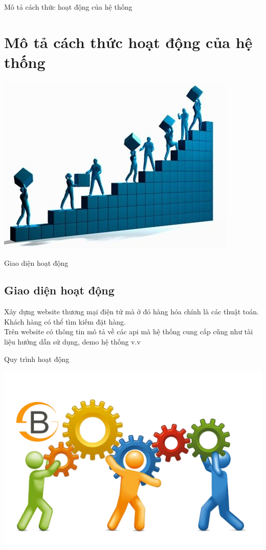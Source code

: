 \documentclass{beamer}
\begin{document}
\begin{frame}{Mô tả cách thức hoạt động của hệ thống}
\section{Mô tả cách thức hoạt động của hệ thống}
\begin{center}
\includegraphics[scale=0.5]{TK.jpg}
\end{center}

\end{frame}
\begin{frame}{Giao diện hoạt động}

\subsection{Giao diện hoạt động}
Xây dựng website thương mại điện tử mà ở đó hàng hóa chính là các thuật toán. Khách hàng có thể tìm kiếm đặt hàng.\\

Trên website có thông tin mô tả về các api mà hệ thống cung cấp cũng như tài liệu hướng dẫn sử dụng, demo hệ thống v.v
\end{frame}
\begin{frame}{Quy trình hoạt động}
\begin{center}
\includegraphics[scale=0.4]{quytrinhhoatdong.png}\\
\end{center}
\end{frame}
\end{document}
